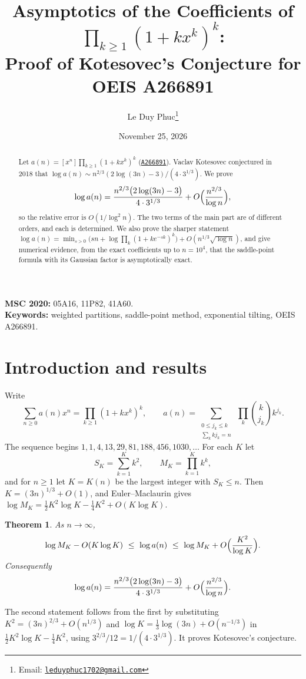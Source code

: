 \documentclass[11pt,a4paper]{article}
\title{Asymptotics of the Coefficients of $\prod_{k\ge1}(1+kx^k)^k$:\\
Proof of Kotesovec's Conjecture for OEIS A266891}
\author{Le Duy Phuc\thanks{Email: \href{mailto:leduyphuc1702@gmail.com}{\texttt{leduyphuc1702@gmail.com}}}}
\date{November 25, 2026}
\newtheorem{theorem}{Theorem}
\theoremstyle{remark}
\newcommand{\oeis}[1]{\href{https://oeis.org/#1}{\texttt{#1}}}
\begin{document}
\maketitle

\begin{abstract}
Let $a(n)=[x^n]\prod_{k\ge1}(1+kx^k)^k$ (\oeis{A266891}). Vaclav Kotesovec conjectured in 2018 that $\log a(n)\sim n^{2/3}(2\log(3n)-3)/(4\cdot3^{1/3})$. We prove
\[
 \log a(n)=\frac{n^{2/3}\bigl(2\log(3n)-3\bigr)}{4\cdot 3^{1/3}}+O\Bigl(\frac{n^{2/3}}{\log n}\Bigr),
\]
so the relative error is $O(1/\log^2 n)$. The two terms of the main part are of different orders, and each is determined. We also prove the sharper statement $\log a(n)=\min_{s>0}\bigl(sn+\log\prod_k(1+ke^{-sk})^k\bigr)+O(n^{1/3}\sqrt{\log n})$, and give numerical evidence, from the exact coefficients up to $n=10^4$, that the saddle-point formula with its Gaussian factor is asymptotically exact.
\end{abstract}

\noindent\textbf{MSC 2020:} 05A16, 11P82, 41A60.\\
\textbf{Keywords:} weighted partitions, saddle-point method, exponential tilting, OEIS A266891.

\section{Introduction and results}

Write
\[
 \sum_{n\ge0}a(n)x^n=\prod_{k\ge1}(1+kx^k)^k,\qquad a(n)=\sum_{\substack{0\le j_k\le k\\ \sum_k kj_k=n}}\ \prod_k\binom k{j_k}k^{j_k}.
\]
The sequence begins $1,1,4,13,29,81,188,456,1030,\ldots$ For each $K$ let
\[
 S_K=\sum_{k=1}^Kk^2,\qquad M_K=\prod_{k=1}^Kk^k ,
\]
and for $n\ge1$ let $K=K(n)$ be the largest integer with $S_K\le n$. Then $K=(3n)^{1/3}+O(1)$, and Euler--Maclaurin gives $\log M_K=\tfrac12K^2\log K-\tfrac14K^2+O(K\log K)$.

\begin{theorem}\label{thm:main}
As $n\to\infty$,
\[
 \log M_K-O(K\log K)\ \le\ \log a(n)\ \le\ \log M_K+O\Bigl(\frac{K^2}{\log K}\Bigr).
\]
Consequently
\[
 \log a(n)=\frac{n^{2/3}\bigl(2\log(3n)-3\bigr)}{4\cdot3^{1/3}}+O\Bigl(\frac{n^{2/3}}{\log n}\Bigr).
\]
\end{theorem}

The second statement follows from the first by substituting $K^2=(3n)^{2/3}+O(n^{1/3})$ and $\log K=\frac13\log(3n)+O(n^{-1/3})$ in $\frac12K^2\log K-\frac14K^2$, using $3^{2/3}/12=1/(4\cdot 3^{1/3})$. It proves Kotesovec's conjecture.
\end{document}

